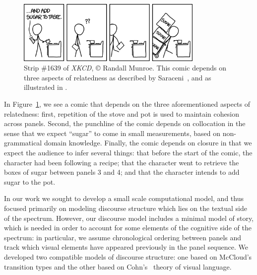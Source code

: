 %
\begin{figure}[t]
  \centering
	\includegraphics[width=9cm]{xkcd-to_taste.png}
	\caption{
		Strip \#1639 of {\em XKCD}, {\small\copyright} Randall Munroe. This comic
		depends on three aspects of relatedness as described by 
                Saraceni~\cite{saraceni2016relatedness}, and as illustrated in 
		.
	}
\label{fig:xkcd}
\end{figure}
In Figure~\ref{fig:xkcd}, we see a comic that depends on the three aforementioned 
aspects of relatedness: first, repetition of the stove and pot is used to maintain
cohesion across panels. Second, the punchline of the comic depends on
collocation in the sense that we expect ``sugar'' to come in small
measurements, based on non-grammatical domain knowledge.  Finally, the
comic depends on closure in that we expect the audience to infer several
things: that before the start of the comic, the character had been
following a recipe; that the character went to retrieve the boxes of sugar
between panels 3 and 4; and that the character intends to add sugar to the
pot.

%
%
%

In our work we sought to develop a small scale computational model, and thus
focused primarily on modeling discourse structure which lies on the textual
side of the spectrum. However, our discourse model includes a minimal model of
story, which is needed in order to account for some elements of the cognitive
side of the spectrum: in particular, we assume chronological ordering
between panels and track which visual elements have appeared previously in the
panel sequence.  We developed two compatible models of discourse
structure: one based on McCloud's transition types and the other based on
Cohn's~\cite{cohn2013visual} theory of visual language.



